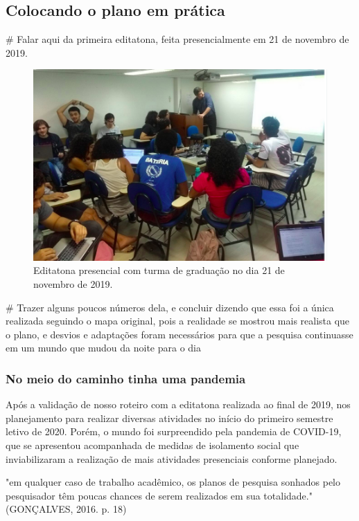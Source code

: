 \subsection{Colocando o plano em prática}

# Falar aqui da primeira editatona, feita presencialmente em 21 de novembro de 2019.

\begin{figure}[H]
    \centering
    \includegraphics[width=1\textwidth]{Images/editatona_presencial.png}
    \caption{Editatona presencial com turma de graduação no dia 21 de novembro de 2019.}
    \label{fig:editatona_presencial}
\end{figure}

# Trazer alguns poucos números dela, e concluir dizendo que essa foi a única realizada seguindo o mapa original, pois a realidade se mostrou mais realista que o plano, e desvios e adaptações foram necessários para que a pesquisa continuasse em um mundo que mudou da noite para o dia


\subsubsection{No meio do caminho tinha uma pandemia}

Após a validação de nosso roteiro com a editatona realizada ao final de 2019, nos planejamento para realizar diversas atividades no início do primeiro semestre letivo de 2020. Porém, o mundo foi surpreendido pela pandemia de COVID-19, que se apresentou acompanhada de medidas de isolamento social que inviabilizaram a realização de mais atividades presenciais conforme planejado.

"em qualquer caso de trabalho acadêmico, os planos de pesquisa sonhados pelo pesquisador têm poucas chances de serem realizados em sua totalidade." (GONÇALVES, 2016. p. 18)

